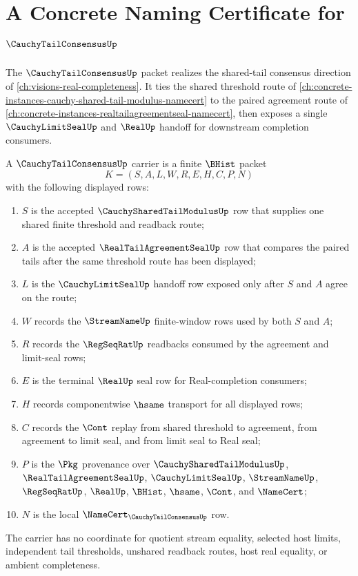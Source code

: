 \chapter{A Concrete Naming Certificate for $\CauchyTailConsensusUp$}
\label{ch:concrete-instances-cauchy-tail-consensus-namecert}

The $\CauchyTailConsensusUp$ packet realizes the shared-tail consensus direction of \autoref{ch:visions-real-completeness}. It ties the shared threshold route of \autoref{ch:concrete-instances-cauchy-shared-tail-modulus-namecert} to the paired agreement route of \autoref{ch:concrete-instances-realtailagreementseal-namecert}, then exposes a single $\CauchyLimitSealUp$ and $\RealUp$ handoff for downstream completion consumers.

\begin{definition}
\label{def:cauchy-tail-consensus-carrier}
A $\CauchyTailConsensusUp$ carrier is a finite $\BHist$ packet
$$
K=(S,A,L,W,R,E,H,C,P,N)
$$
with the following displayed rows:
\begin{enumerate}
\item $S$ is the accepted $\CauchySharedTailModulusUp$ row that supplies one shared finite threshold and readback route;
\item $A$ is the accepted $\RealTailAgreementSealUp$ row that compares the paired tails after the same threshold route has been displayed;
\item $L$ is the $\CauchyLimitSealUp$ handoff row exposed only after $S$ and $A$ agree on the route;
\item $W$ records the $\StreamNameUp$ finite-window rows used by both $S$ and $A$;
\item $R$ records the $\RegSeqRatUp$ readbacks consumed by the agreement and limit-seal rows;
\item $E$ is the terminal $\RealUp$ seal row for Real-completion consumers;
\item $H$ records componentwise $\hsame$ transport for all displayed rows;
\item $C$ records the $\Cont$ replay from shared threshold to agreement, from agreement to limit seal, and from limit seal to Real seal;
\item $P$ is the $\Pkg$ provenance over $\CauchySharedTailModulusUp$, $\RealTailAgreementSealUp$, $\CauchyLimitSealUp$, $\StreamNameUp$, $\RegSeqRatUp$, $\RealUp$, $\BHist$, $\hsame$, $\Cont$, and $\NameCert$;
\item $N$ is the local $\NameCert_{\CauchyTailConsensusUp}$ row.
\end{enumerate}
The carrier has no coordinate for quotient stream equality, selected host limits, independent tail thresholds, unshared readback routes, host real equality, or ambient completeness.
\end{definition}

